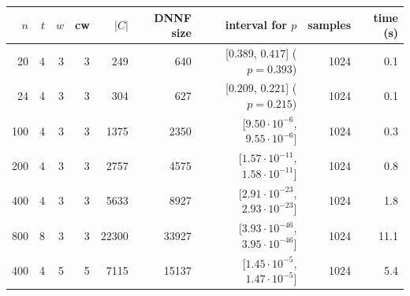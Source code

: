 \begin{tabular}{rrrrrrrrr}
\toprule
$n$ & $t$ & $w$ & cw & $|C|$ & DNNF size & interval for $p$ & samples & time (s)\\
\midrule
20 & 4 & 3 & 3 & 249 & 640 & [$0.389$, $0.417$] ($p=0.393$) & 1024 & 0.1\\
24 & 4 & 3 & 3 & 304 & 627 & [$0.209$, $0.221$] ($p=0.215$) & 1024 & 0.1\\
100 & 4 & 3 & 3 & 1375 & 2350 & [$9.50\cdot10^{-6}$, $9.55\cdot10^{-6}$] & 1024 & 0.3\\
200 & 4 & 3 & 3 & 2757 & 4575 & [$1.57\cdot10^{-11}$, $1.58\cdot10^{-11}$] & 1024 & 0.8\\
400 & 4 & 3 & 3 & 5633 & 8927 & [$2.91\cdot10^{-23}$, $2.93\cdot10^{-23}$] & 1024 & 1.8\\
800 & 8 & 3 & 3 & 22300 & 33927 & [$3.93\cdot10^{-46}$, $3.95\cdot10^{-46}$] & 1024 & 11.1\\
400 & 4 & 5 & 5 & 7115 & 15137 & [$1.45\cdot10^{-5}$, $1.47\cdot10^{-5}$] & 1024 & 5.4\\
\bottomrule
\end{tabular}
